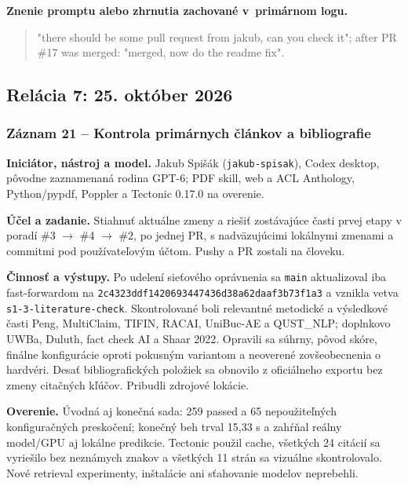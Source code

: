 \par\noindent\textbf{Znenie promptu alebo zhrnutia zachované v~primárnom logu.}

\begin{quote}\normalsize "there should be some pull request from jakub, can you check it"; after PR \#17 was merged: "merged, now do the readme fix".\end{quote}

\subsection*{Relácia 7: 25. október 2026}

\subsubsection*{Záznam 21 -- Kontrola primárnych článkov a bibliografie}


\par\noindent \textbf{Iniciátor, nástroj a model.} Jakub Spišák (\texttt{jakub-\allowbreak{}spisak}), Codex desktop, pôvodne zaznamenaná rodina GPT-6; PDF skill, web a ACL Anthology, Python/pypdf, Poppler a Tectonic 0.17.0 na overenie.\par\smallskip
\par\noindent \textbf{Účel a zadanie.} Stiahnuť aktuálne zmeny a riešiť zostávajúce časti prvej etapy v poradí \#3 $\to$ \#4 $\to$ \#2, po jednej PR, s nadväzujúcimi lokálnymi zmenami a commitmi pod používateľovým účtom. Pushy a PR zostali na človeku.\par\smallskip
\par\noindent \textbf{Činnosť a výstupy.} Po udelení sieťového oprávnenia sa \texttt{main} aktualizoval iba fast-forwardom na \texttt{2c4323ddf142\allowbreak{}0693447436d3\allowbreak{}8a62daaf3b73\allowbreak{}f1a3} a vznikla vetva \texttt{s1-\allowbreak{}3-\allowbreak{}literature-\allowbreak{}check}. Skontrolované boli relevantné metodické a výsledkové časti Peng, MultiClaim, TIFIN, RACAI, UniBuc-AE a QUST\_NLP; doplnkovo UWBa, Duluth, fact check AI a Shaar 2022. Opravili sa súhrny, pôvod skóre, finálne konfigurácie oproti pokusným variantom a neoverené zovšeobecnenia o hardvéri. Desať bibliografických položiek sa obnovilo z oficiálneho exportu bez zmeny citačných kľúčov. Pribudli zdrojové lokácie.\par\smallskip
\par\noindent \textbf{Overenie.} Úvodná aj konečná sada: 259 passed a 65 nepoužiteľných konfiguračných preskočení; konečný beh trval 15,33 s a zahŕňal reálny model/GPU aj lokálne predikcie. Tectonic použil cache, všetkých 24 citácií sa vyriešilo bez neznámych znakov a všetkých 11 strán sa vizuálne skontrolovalo. Nové retrieval experimenty, inštalácie ani sťahovanie modelov neprebehli.\par\smallskip

